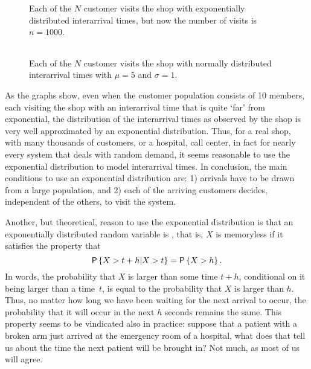 \begin{figure}[ht]
  \centering
  \begin{tabular}[h]{c}
 \\
  \end{tabular}
  \caption{Each of the $N$ customer visits the shop with exponentially
    distributed interarrival times, but now the number of visits is
    $n=1000$.}  
  \label{fig:uniformmany}
\end{figure}


\begin{figure}[ht]
  \centering
  \begin{tabular}[h]{c}
 
  \end{tabular}
  \caption{Each of the $N$ customer visits the shop with normally
    distributed interarrival times with $\mu=5$ and
    $\sigma=1$.}  \label{fig:normal}
\end{figure}

As the graphs show, even when the customer population consists of 10
members, each visiting the shop with an interarrival time that is
quite `far' from exponential, the distribution of the interarrival
times as observed by the shop is very well approximated by an
exponential distribution. Thus, for a real shop, with many thousands
of customers, or a hospital, call center, in fact for nearly every
system that deals with random demand, it seems reasonable to use the
exponential distribution to model interarrival times.  In conclusion,
the main conditions to use an exponential distribution are: 1)
arrivals have to be drawn from a large population, and 2) each of the
arriving customers decides, independent of the others, to visit the
system.

Another, but theoretical, reason to use the exponential distribution
is that an exponentially distributed random variable is
, that is, $X$ is memoryless if it satisfies the
property that
\begin{equation*}
  \P{X > t+h | X>t} = \P{X>h}.
\end{equation*}
In words, the probability that $X$ is larger than some time $t+h$,
conditional on it being larger than a time~$t$, is equal to the
probability that $X$ is larger than $h$. Thus, no matter how long we
have been waiting for the next arrival to occur, the probability that
it will occur in the next $h$ seconds remains the same.  This property
seems to be vindicated also in practice: suppose that a patient with a
broken arm just arrived at the emergency room of a hospital, what does
that tell us about the time the next patient will be brought in? Not
much, as most of us will agree.

